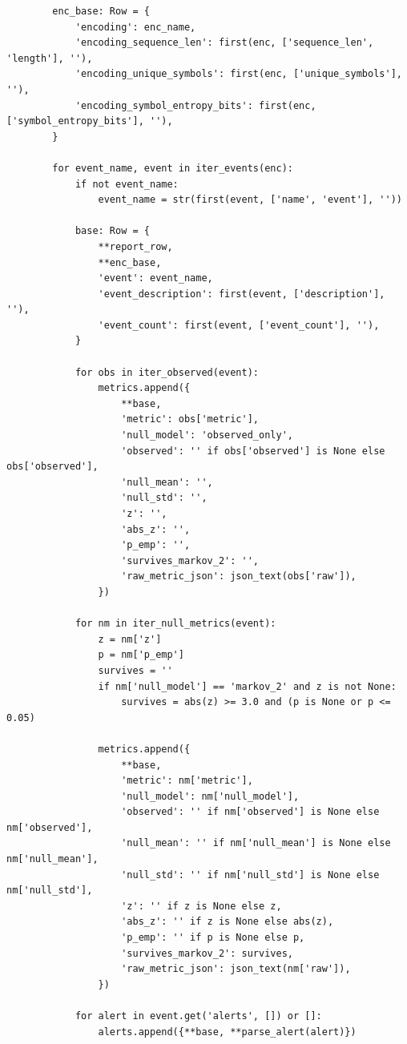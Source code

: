 \documentclass[11pt,a4paper]{article}
\begin{document}
\begin{lstlisting}
        enc_base: Row = {
            'encoding': enc_name,
            'encoding_sequence_len': first(enc, ['sequence_len', 'length'], ''),
            'encoding_unique_symbols': first(enc, ['unique_symbols'], ''),
            'encoding_symbol_entropy_bits': first(enc, ['symbol_entropy_bits'], ''),
        }

        for event_name, event in iter_events(enc):
            if not event_name:
                event_name = str(first(event, ['name', 'event'], ''))

            base: Row = {
                **report_row,
                **enc_base,
                'event': event_name,
                'event_description': first(event, ['description'], ''),
                'event_count': first(event, ['event_count'], ''),
            }

            for obs in iter_observed(event):
                metrics.append({
                    **base,
                    'metric': obs['metric'],
                    'null_model': 'observed_only',
                    'observed': '' if obs['observed'] is None else obs['observed'],
                    'null_mean': '',
                    'null_std': '',
                    'z': '',
                    'abs_z': '',
                    'p_emp': '',
                    'survives_markov_2': '',
                    'raw_metric_json': json_text(obs['raw']),
                })

            for nm in iter_null_metrics(event):
                z = nm['z']
                p = nm['p_emp']
                survives = ''
                if nm['null_model'] == 'markov_2' and z is not None:
                    survives = abs(z) >= 3.0 and (p is None or p <= 0.05)

                metrics.append({
                    **base,
                    'metric': nm['metric'],
                    'null_model': nm['null_model'],
                    'observed': '' if nm['observed'] is None else nm['observed'],
                    'null_mean': '' if nm['null_mean'] is None else nm['null_mean'],
                    'null_std': '' if nm['null_std'] is None else nm['null_std'],
                    'z': '' if z is None else z,
                    'abs_z': '' if z is None else abs(z),
                    'p_emp': '' if p is None else p,
                    'survives_markov_2': survives,
                    'raw_metric_json': json_text(nm['raw']),
                })

            for alert in event.get('alerts', []) or []:
                alerts.append({**base, **parse_alert(alert)})


\end{lstlisting}
\end{document}
